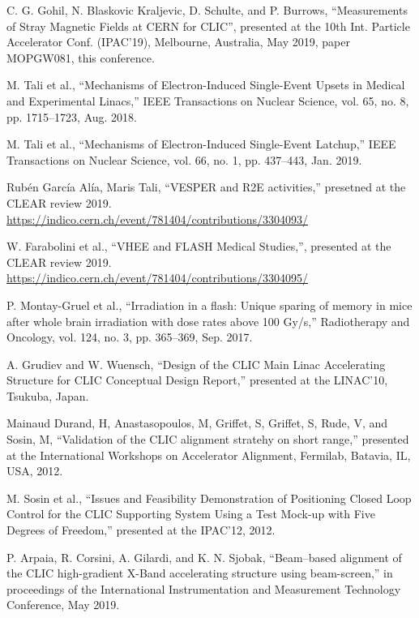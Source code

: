 \documentclass[a4paper,
               keeplastbox,   %
               ]{jacow}
\begin{document}
\begin{thebibliography}{99}
   C. G. Gohil, N. Blaskovic Kraljevic, D. Schulte, and P. Burrows,
   \textquotedblleft{Measurements of Stray Magnetic Fields at CERN for CLIC}\textquotedblright,
   presented at the 10th Int. Particle Accelerator Conf. (IPAC'19), Melbourne, Australia, May 2019, paper MOPGW081, this conference.

 M. Tali et al., “Mechanisms of Electron-Induced Single-Event Upsets in Medical and Experimental Linacs,” IEEE Transactions on Nuclear Science, vol. 65, no. 8, pp. 1715–1723, Aug. 2018.

 M. Tali et al., “Mechanisms of Electron-Induced Single-Event Latchup,” IEEE Transactions on Nuclear Science, vol. 66, no. 1, pp. 437–443, Jan. 2019.

 Rubén García Alía, Maris Tali, ``VESPER and R2E activities,'' presetned at the CLEAR review 2019. \url{https://indico.cern.ch/event/781404/contributions/3304093/}

 W. Farabolini et al., ``VHEE and FLASH Medical Studies,'', presented at the CLEAR review 2019. \url{https://indico.cern.ch/event/781404/contributions/3304095/}

 P. Montay-Gruel et al., “Irradiation in a flash: Unique sparing of memory in mice after whole brain irradiation with dose rates above 100 Gy/s,” Radiotherapy and Oncology, vol. 124, no. 3, pp. 365–369, Sep. 2017.

 A. Grudiev and W. Wuensch, “Design of the CLIC Main Linac Accelerating Structure for CLIC Conceptual Design Report,” presented at the LINAC’10, Tsukuba, Japan.

 Mainaud Durand, H, Anastasopoulos, M, Griffet, S, Griffet, S, Rude, V, and Sosin, M, “Validation of the CLIC alignment stratehy on short range,” presented at the International Workshops on Accelerator Alignment, Fermilab, Batavia, IL, USA, 2012.

 M. Sosin et al., “Issues and Feasibility Demonstration of Positioning Closed Loop Control for the CLIC Supporting System Using a Test Mock-up with Five Degrees of Freedom,” presented at the IPAC’12, 2012.

 P. Arpaia, R. Corsini, A. Gilardi, and K. N. Sjobak, “Beam–based alignment of the CLIC high-gradient X-Band accelerating structure using beam-screen,” in proceedings of the International Instrumentation and Measurement Technology Conference, May 2019.


\end{thebibliography}
\end{document}
